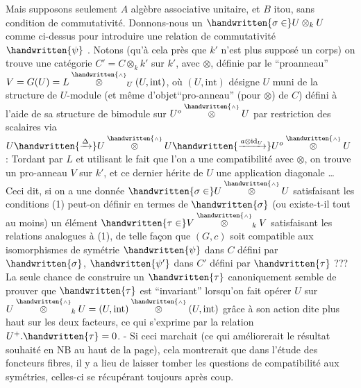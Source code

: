 Mais supposons seulement $A$ algèbre associative unitaire, et $B$ itou, sans condition de commutativité. Donnons-nous un $\handwritten{\sigma\in}U\otimes_k U$  comme ci-dessus pour introduire une relation de commutativité $\handwritten{\psi}$ . Notons (qu'à cela près que $k'$ n'est plus supposé un corps) on trouve une catégorie $C'=C\otimes_k k'$ sur $k'$, avec $\otimes$, définie par le ``proanneau'' $V=G(U)=L\overset{\handwritten{\scriptscriptstyle\wedge}}{\otimes}_U(U,\mathrm{int})$, où $(U,\mathrm{int})$ désigne $U$ muni de la structure de $U$-module  (et même d'objet``pro-anneau'' (pour $\otimes$) de $C$) défini à l'aide de sa structure de bimodule sur $U^o\overset{\handwritten{\scriptscriptstyle\wedge}}{\otimes} U$  par restriction des scalaires via $U\handwritten{\xrightarrow{\Delta}}U\overset{\handwritten{\scriptscriptstyle\wedge}}{\otimes} U\handwritten{\xrightarrow{a\otimes\mathrm{id}_U}}U^o\overset{\handwritten{\scriptscriptstyle\wedge}}{\otimes} U$ : Tordant par $L$ et utilisant le fait que l'on a une compatibilité avec $\otimes$, on trouve un pro-anneau $V$ sur $k'$, et ce dernier hérite de $U$ une application diagonale \ldots
{}
Ceci dit, si on a une donnée $\handwritten{\sigma\in}U\overset{\handwritten{\scriptscriptstyle\wedge}}{\otimes} U$ satisfaisant les conditions (1) peut-on définir en termes de $\handwritten{\sigma}$ (ou existe-t-il tout au moins) un élément $\handwritten{\tau\in}V\overset{\handwritten{\scriptscriptstyle\wedge}}{\otimes}_k V$ satisfaisant les relations analogues à (1), de telle façon que $(G,c)$ soit compatible aux isomorphismes de symétrie $\handwritten{\psi}$ dans $C$ défini par $\handwritten{\sigma}$, $\handwritten{\psi'}$ dans $C'$ défini par $\handwritten{\tau}$ ??? La seule chance de  construire un $\handwritten{\tau}$ canoniquement semble de prouver que $\handwritten{\tau}$ est ``invariant'' lorsqu'on fait opérer $U$ sur $U\overset{\handwritten{\scriptscriptstyle\wedge}}{\otimes}_k U=(U,\mathrm{int})\overset{\handwritten{\scriptscriptstyle\wedge}}{\otimes}(U,\mathrm{int})$ grâce à son action dite plus haut sur les deux facteurs, ce qui s'exprime par la relation $U^+ .\handwritten{\tau}=0$. - Si ceci marchait (ce qui améliorerait le résultat souhaité en NB au haut de la page), cela montrerait que dans l'étude des foncteurs fibres, il y a lieu de laisser tomber les questions de compatibilité aux symétries, celles-ci se récupérant toujours après coup.
